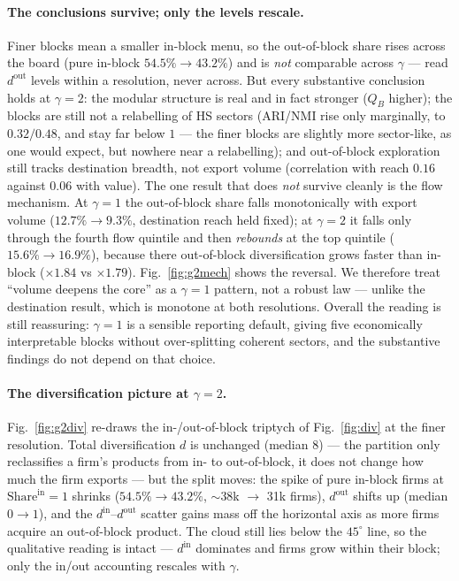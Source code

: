\documentclass[11pt]{article}
\newcommand{\din}{d^{\mathrm{in}}}
\newcommand{\dout}{d^{\mathrm{out}}}
\newcommand{\QB}{Q_B}
\begin{document}
\paragraph{The conclusions survive; only the levels rescale.} Finer blocks mean a smaller in-block menu, so the
out-of-block share rises across the board (pure in-block $54.5\%\to43.2\%$) and is \emph{not} comparable across
$\gamma$ --- read $\dout$ levels within a resolution, never across. But every substantive conclusion holds at
$\gamma=2$: the modular structure is real and in fact stronger ($\QB$ higher); the blocks are still not a
relabelling of HS sectors (ARI/NMI rise only marginally, to $0.32/0.48$, and stay far below $1$ --- the finer
blocks are slightly more sector-like, as one would expect, but nowhere near a relabelling); and out-of-block
exploration still tracks destination breadth, not export volume (correlation with reach $0.16$ against $0.06$
with value). The one result that does \emph{not}
survive cleanly is the flow mechanism. At $\gamma=1$ the out-of-block share falls monotonically with export
volume ($12.7\%\to9.3\%$, destination reach held fixed); at $\gamma=2$ it falls only through the fourth flow
quintile and then \emph{rebounds} at the top quintile ($15.6\%\to16.9\%$), because there out-of-block
diversification grows faster than in-block ($\times1.84$ vs $\times1.79$). Fig.~\ref{fig:g2mech} shows the
reversal. We therefore treat ``volume deepens the core'' as a $\gamma=1$ pattern, not a robust law --- unlike
the destination result, which is monotone at both resolutions. Overall the reading is still reassuring:
$\gamma=1$ is a sensible reporting default, giving five economically interpretable blocks without over-splitting
coherent sectors, and the substantive findings do not depend on that choice.

\paragraph{The diversification picture at $\gamma=2$.} Fig.~\ref{fig:g2div} re-draws the in-/out-of-block
triptych of Fig.~\ref{fig:div} at the finer resolution. Total diversification $d$ is unchanged (median $8$) ---
the partition only reclassifies a firm's products from in- to out-of-block, it does not change how much the
firm exports --- but the split moves: the spike of pure in-block firms at $\mathrm{Share}^{\mathrm{in}}=1$
shrinks ($54.5\%\to43.2\%$, $\sim$38k $\to$ 31k firms), $\dout$ shifts up (median $0\to1$), and the
$\din$--$\dout$ scatter gains mass off the horizontal axis as more firms acquire an out-of-block product. The
cloud still lies below the $45^\circ$ line, so the qualitative reading is intact --- $\din$ dominates and firms
grow within their block; only the in/out accounting rescales with $\gamma$.
\end{document}
